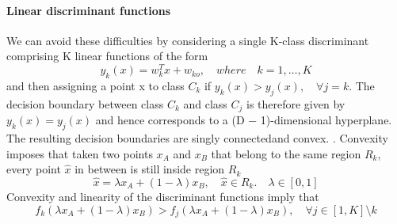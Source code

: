 \documentclass[main.tex]{subfiles}
\begin{document}
\newpage
\paragraph{Linear discriminant functions}
We can avoid these difficulties by considering a single K-class discriminant comprising K linear functions of the form
\begin{equation}
    y_k(x) = w_k^Tx + w_{ko},\quad where \quad k=1,\dots,K
\end{equation}
and then assigning a point x to class $C_k$ if $y_k(x) > y_j (x), \quad \forall j = k$. The decision boundary between class $C_k$ and class $C_j$ is therefore given by $y_k(x) = y_j(x)$ and hence corresponds to a (D − 1)-dimensional hyperplane.
The resulting decision boundaries are singly connected\footnotemark and convex. . Convexity imposes that taken two points $x_A$ and $x_B$ that belong to the same region $R_k$, every point $\hat{x}$ in between is still inside region $R_k$
\begin{equation*}
    \hat{x} = \lambda x_A + (1-\lambda)x_B, \quad \hat{x}\in R_k. \quad \lambda \in [0, 1]
\end{equation*}
Convexity and linearity of the discriminant functions imply that
\begin{equation*}
    f_k(\lambda x_A + (1-\lambda)x_B) > f_j(\lambda x_A + (1-\lambda)x_B), \quad \forall j \in [1, K] \setminus k
\end{equation*}
\end{document}
